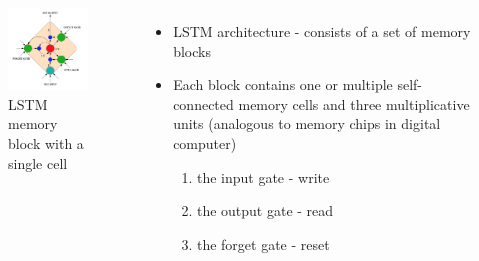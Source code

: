 \documentclass{beamer}
\begin{document}
\frame
{
	\begin{columns}
		\begin{figure}[ht]  
			\begin{center}
				\includegraphics[width=2.1in]{Images/LSTM.png}   
			\end{center}   
			\caption{\centering LSTM memory block with a single cell}
		\end{figure}
		\begin{itemize}
		\item LSTM architecture - consists of a set of memory blocks	
		\item Each block contains one or multiple self-connected memory cells and three multiplicative units	(analogous to memory chips in digital computer)
			\begin{enumerate}
			\item the input gate - write
			\item the output gate - read
			\item the forget gate - reset
			\end{enumerate}
		\end{itemize}
	\end{columns}
}
\frame
\end{document}
